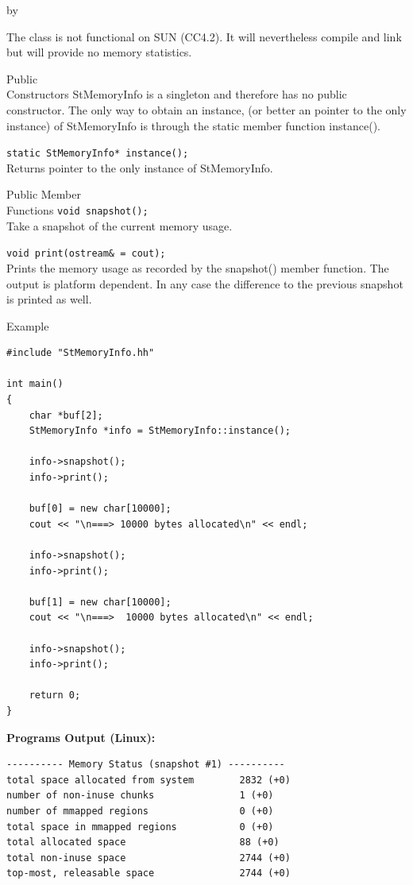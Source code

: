 \documentclass[twoside]{article}
\newcommand{\entrylabel}[1]{\mbox{\textbf{{#1}}}\hfil}%
\newenvironment{entry}
{\begin{list}{}%
    {\renewcommand{\makelabel}{\entrylabel}%
     \setlength{\labelwidth}{90pt}%
     \setlength{\leftmargin}{\labelwidth}
     \advance\leftmargin by \labelsep%
      }%
    }%
  {\end{list}}
\newcommand{\Entrylabel}[1]%
{\raisebox{0pt}[1ex][0pt]{\makebox[\labelwidth][l]%
    {\parbox[t]{\labelwidth}{\hspace{0pt}\textbf{{#1}}}}}}
\newenvironment{Entry}%
{\renewcommand{\entrylabel}{\Entrylabel}\begin{entry}}%
  {\end{entry}}
\begin{document}
\begin{description}
\begin{Entry}
    The class is not functional on SUN (CC4.2). It will nevertheless
    compile and link but will provide no memory statistics.
        
\item[Public\\ Constructors]
    StMemoryInfo is a singleton and therefore has no
    public constructor. The only way to obtain an instance,
    (or better an pointer to the only instance)
    of StMemoryInfo is through the static member function
    instance().

    \verb+static StMemoryInfo* instance();+\\
    Returns pointer to the only instance of StMemoryInfo.
    
\item[Public Member\\ Functions]
    \verb+void snapshot();+\\
    Take a snapshot of the current memory usage.
    
    \verb+void print(ostream& = cout);+\\
    Prints the memory usage as recorded by the snapshot()
    member function. The output is platform dependent. In any
    case the difference to the previous snapshot is printed
    as well.
    
\item[Example]
{\footnotesize
\begin{verbatim}
#include "StMemoryInfo.hh"

int main()
{
    char *buf[2];
    StMemoryInfo *info = StMemoryInfo::instance();
    
    info->snapshot();
    info->print();

    buf[0] = new char[10000];
    cout << "\n===> 10000 bytes allocated\n" << endl;

    info->snapshot();
    info->print();

    buf[1] = new char[10000];
    cout << "\n===>  10000 bytes allocated\n" << endl;

    info->snapshot();
    info->print();

    return 0;
}
\end{verbatim}
}%
{\bf Programs Output (Linux):}
{\footnotesize
\begin{verbatim}
---------- Memory Status (snapshot #1) ----------
total space allocated from system        2832 (+0) 
number of non-inuse chunks               1 (+0) 
number of mmapped regions                0 (+0) 
total space in mmapped regions           0 (+0) 
total allocated space                    88 (+0) 
total non-inuse space                    2744 (+0) 
top-most, releasable space               2744 (+0) 


\end{verbatim}}
\end{Entry}
\end{description}
\end{document}
